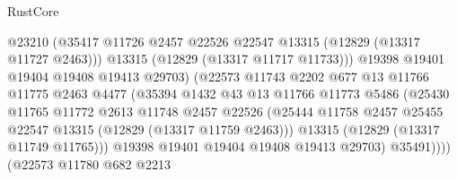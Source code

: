 \begin{lexlean}{RustCore}
\begin{coremodule}
                                    @23210
                                    (@35417
                                      @11726
                                      @2457
                                      @22526
                                      @22547
                                      @13315
                                      (@12829 (@13317 @11727 @2463)))
                                    @13315
                                    (@12829 (@13317 @11717 @11733)))
                                  @19398
                                  @19401
                                  @19404
                                  @19408
                                  @19413
                                  @29703)
                                (@22573
                                  @11743
                                  @2202
                                  @677
                                  @13
                                  @11766
                                  @11775
                                  @2463
                                  @4477
                                  (@35394
                                    @1432
                                    @43
                                    @13
                                    @11766
                                    @11773
                                    @5486
                                    (@25430
                                      @11765
                                      @11772
                                      @2613
                                      @11748
                                      @2457
                                      @22526
                                      (@25444
                                        @11758
                                        @2457
                                        @25455
                                        @22547
                                        @13315
                                        (@12829 (@13317 @11759 @2463)))
                                      @13315
                                      (@12829 (@13317 @11749 @11765)))
                                    @19398
                                    @19401
                                    @19404
                                    @19408
                                    @19413
                                    @29703)
                                  @35491))))
                          (@22573
                            @11780
                            @682
                            @2213

\end{coremodule}
\end{lexlean}
